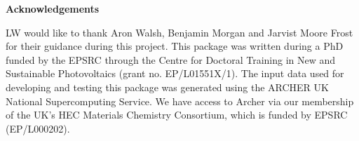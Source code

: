 \textbf{Acknowledgements}

LW would like to thank Aron Walsh, Benjamin Morgan and Jarvist Moore Frost for their guidance during this project. This package was written during a PhD funded by the EPSRC through the Centre for Doctoral Training in New and Sustainable Photovoltaics (grant no. EP/L01551X/1). The input data used for developing and testing this package was generated using the ARCHER UK National Supercomputing Service. We have access to Archer via our membership of the UK's HEC Materials Chemistry Consortium, which is funded by EPSRC (EP/L000202).


